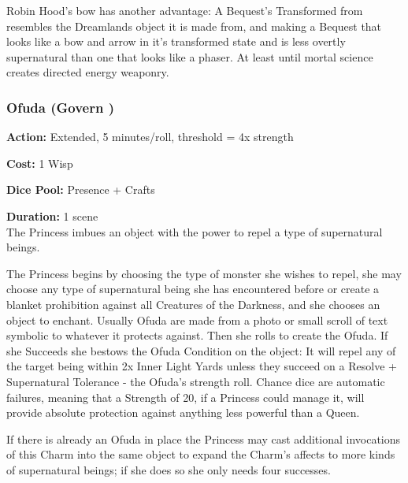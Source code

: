 Robin Hood's bow has another advantage: A Bequest's Transformed from resembles the Dreamlands object it is made from, and making a Bequest that looks like a bow and arrow in it's transformed state and is less overtly supernatural than one that looks like a phaser. At least until mortal science creates directed energy weaponry. 
\bigsidebarend

\subsubsection*{Ofuda (Govern \textbullet\textbullet\textbullet)}

\noindent \textbf{Action:} Extended, 5 minutes/roll, threshold = 4x strength

\noindent \textbf{Cost:} 1 Wisp

\noindent \textbf{Dice Pool:} Presence + Crafts

\noindent \textbf{Duration:} 1 scene \\

\noindent The Princess imbues an object with the power to repel a type of supernatural beings.

The Princess begins by choosing the type of monster she wishes to repel, she may choose any type of supernatural being she has encountered before or create a blanket prohibition against all Creatures of the Darkness, and she chooses an object to enchant. Usually Ofuda are made from a photo or small scroll of text symbolic to whatever it protects against. Then she rolls to create the Ofuda. If she Succeeds she bestows the Ofuda Condition on the object: It will repel any of the target being within 2x Inner Light Yards unless they succeed on a Resolve + Supernatural Tolerance - the Ofuda’s strength roll. Chance dice are automatic failures, meaning that a Strength of 20, if a Princess could manage it, will provide absolute protection against anything less powerful than a Queen.  

If there is already an Ofuda in place the Princess may cast additional invocations of this Charm into the same object to expand the Charm's affects to more kinds of supernatural beings; if she does so she only needs four successes.

